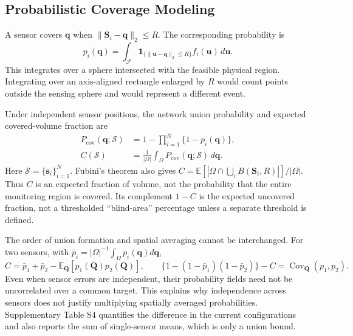 \documentclass[fleqn,10pt]{wlscirep}
\newcommand{\E}{\mathbb{E}}
\begin{document}
\subsection*{Probabilistic Coverage Modeling}
A sensor covers $\mathbf q$ when $\|\mathbf S_i-\mathbf q\|_2\le R$. The corresponding probability is
\begin{equation}\label{eq:single}
p_i(\mathbf q)=\int_{\mathcal F}\mathbf 1_{\{\|\mathbf u-\mathbf q\|_2\le R\}}f_i(\mathbf u)\,d\mathbf u.
\end{equation}
This integrates over a sphere intersected with the feasible physical region. Integrating over an axis-aligned rectangle enlarged by $R$ would count points outside the sensing sphere and would represent a different event.

Under independent sensor positions, the network union probability and expected covered-volume fraction are
\begin{align}
P_{\mathrm{cov}}(\mathbf q;\mathcal S)&=1-\prod_{i=1}^{N}\{1-p_i(\mathbf q)\},\label{eq:union}\\
C(\mathcal S)&=\frac{1}{|\Omega|}\int_{\Omega}P_{\mathrm{cov}}(\mathbf q;\mathcal S)\,d\mathbf q.\label{eq:coverage}
\end{align}
Here $\mathcal S=\{\mathbf s_i\}_{i=1}^N$. Fubini's theorem also gives $C=\E[|\Omega\cap\bigcup_i B(\mathbf S_i,R)|]/|\Omega|$. Thus $C$ is an expected fraction of volume, not the probability that the entire monitoring region is covered. Its complement $1-C$ is the expected uncovered fraction, not a thresholded ``blind-area'' percentage unless a separate threshold is defined.

The order of union formation and spatial averaging cannot be interchanged. For two sensors, with $\bar p_i=|\Omega|^{-1}\int_\Omega p_i(\mathbf q)d\mathbf q$,
\begin{equation}\label{eq:covariance}
C=\bar p_1+\bar p_2-\E_{\mathbf Q}[p_1(\mathbf Q)p_2(\mathbf Q)],\qquad
\{1-(1-\bar p_1)(1-\bar p_2)\}-C=\operatorname{Cov}_{\mathbf Q}(p_1,p_2).
\end{equation}
Even when sensor errors are independent, their probability fields need not be uncorrelated over a common target. This explains why independence across sensors does not justify multiplying spatially averaged probabilities. Supplementary Table S4 quantifies the difference in the current configurations and also reports the sum of single-sensor means, which is only a union bound.
\end{document}
